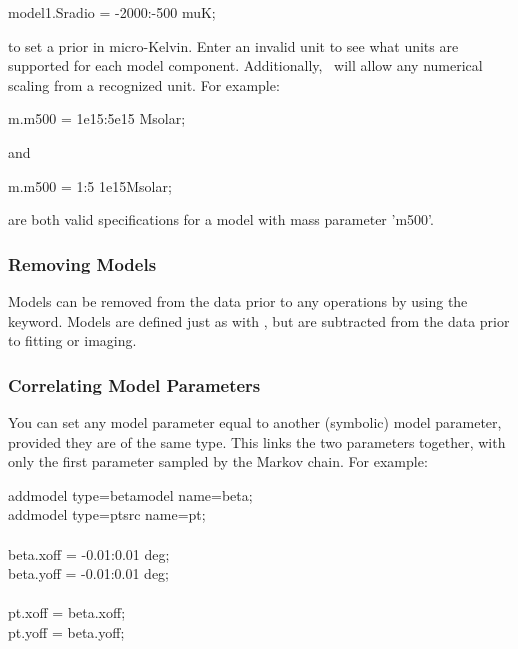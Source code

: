 \begin{myindentpar}{3cm}
model1.Sradio = -2000:-500 muK;
\end{myindentpar}

to set a prior in micro-Kelvin.  Enter an invalid unit to see what
units are supported for each model component.  Additionally,
\climax\ will allow any numerical scaling from a recognized unit.  For
example:

\begin{myindentpar}{3cm}
m.m500 = 1e15:5e15 Msolar;
\end{myindentpar}

and 

\begin{myindentpar}{3cm}
m.m500 = 1:5 1e15Msolar;
\end{myindentpar}

are both valid specifications for a model with mass parameter 'm500'.

\subsubsection{Removing Models}

Models can be removed from the data prior to any operations by using
the  keyword.  Models are defined just as with
, but are subtracted from the data prior to fitting or
imaging.

\subsubsection{Correlating Model Parameters}

You can set any model parameter equal to another (symbolic) model
parameter, provided they are of the same type.  This links the two
parameters together, with only the first parameter sampled by the
Markov chain.  For example:

\begin{myindentpar}{3cm}
addmodel type=betamodel name=beta;\\
addmodel type=ptsrc name=pt;\\
\\
beta.xoff = -0.01:0.01 deg;\\
beta.yoff = -0.01:0.01 deg;\\
\\
pt.xoff = beta.xoff;\\
pt.yoff = beta.yoff;
\end{myindentpar}

